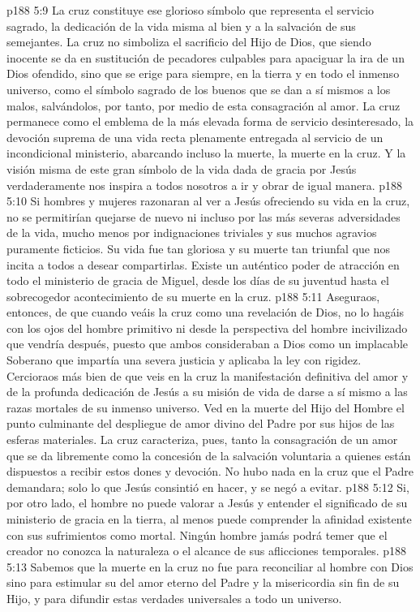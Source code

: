 \vs p188 5:9 \pc La cruz constituye ese glorioso símbolo que representa el servicio sagrado, la dedicación de la vida misma al bien y a la salvación de sus semejantes. La cruz no simboliza el sacrificio del Hijo de Dios, que siendo inocente se da en sustitución de pecadores culpables para apaciguar la ira de un Dios ofendido, sino que se erige para siempre, en la tierra y en todo el inmenso universo, como el símbolo sagrado de los buenos que se dan a sí mismos a los malos, salvándolos, por tanto, por medio de esta consagración al amor. La cruz permanece como el emblema de la más elevada forma de servicio desinteresado, la devoción suprema de una vida recta plenamente entregada al servicio de un incondicional ministerio, abarcando incluso la muerte, la muerte en la cruz. Y la visión misma de este gran símbolo de la vida dada de gracia por Jesús verdaderamente nos inspira a todos nosotros a ir y obrar de igual manera.
\vs p188 5:10 Si hombres y mujeres razonaran al ver a Jesús ofreciendo su vida en la cruz, no se permitirían quejarse de nuevo ni incluso por las más severas adversidades de la vida, mucho menos por indignaciones triviales y sus muchos agravios puramente ficticios. Su vida fue tan gloriosa y su muerte tan triunfal que nos incita a todos a desear compartirlas. Existe un auténtico poder de atracción en todo el ministerio de gracia de Miguel, desde los días de su juventud hasta el sobrecogedor acontecimiento de su muerte en la cruz.
\vs p188 5:11 Aseguraos, entonces, de que cuando veáis la cruz como una revelación de Dios, no lo hagáis con los ojos del hombre primitivo ni desde la perspectiva del hombre incivilizado que vendría después, puesto que ambos consideraban a Dios como un implacable Soberano que impartía una severa justicia y aplicaba la ley con rigidez. Cercioraos más bien de que veis en la cruz la manifestación definitiva del amor y de la profunda dedicación de Jesús a su misión de vida de darse a sí mismo a las razas mortales de su inmenso universo. Ved en la muerte del Hijo del Hombre el punto culminante del despliegue de amor divino del Padre por sus hijos de las esferas materiales. La cruz caracteriza, pues, tanto la consagración de un amor que se da libremente como la concesión de la salvación voluntaria a quienes están dispuestos a recibir estos dones y devoción. No hubo nada en la cruz que el Padre demandara; solo lo que Jesús consintió en hacer, y se negó a evitar.
\vs p188 5:12 \pc Si, por otro lado, el hombre no puede valorar a Jesús y entender el significado de su ministerio de gracia en la tierra, al menos puede comprender la afinidad existente con sus sufrimientos como mortal. Ningún hombre jamás podrá temer que el creador no conozca la naturaleza o el alcance de sus aflicciones temporales.
\vs p188 5:13 Sabemos que la muerte en la cruz no fue para reconciliar al hombre con Dios sino para estimular su  del amor eterno del Padre y la misericordia sin fin de su Hijo, y para difundir estas verdades universales a todo un universo.
